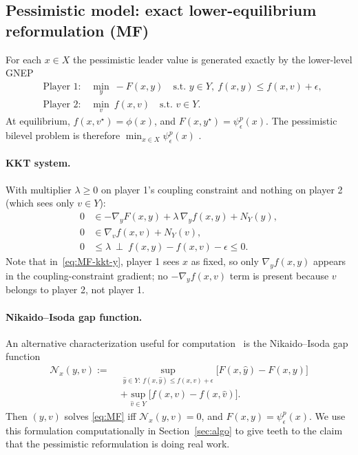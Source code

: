 \documentclass[11pt]{article}
\theoremstyle{definition}
\newcommand{\eps}{\epsilon}
\begin{document}
\subsection{Pessimistic model: exact lower-equilibrium reformulation (MF)}
\label{sec:MF}
For each $x\in X$ the pessimistic leader value is generated
exactly by the lower-level GNEP
\begin{equation}\tag{MF}\label{eq:MF}
\begin{aligned}
  &\text{Player 1:}\quad \min_{y}\ -F(x,y)
  \quad \text{s.t. } y\in Y,\ f(x,y)\le f(x,v)+\eps,\\
  &\text{Player 2:}\quad \min_{v}\ f(x,v)
  \quad \text{s.t. } v\in Y.
\end{aligned}
\end{equation}
At equilibrium, $f(x,v^\star)=\phi(x)$, and
$F(x,y^\star)=\psi_\eps^p(x)$. The pessimistic bilevel problem is
therefore $\min_{x\in X}\psi_\eps^p(x)$
\cite{lampariello2019standard}.

\paragraph{KKT system.}
With multiplier $\lambda\ge 0$ on player 1's coupling constraint
and nothing on player 2 (which sees only $v\in Y$):
\begin{align}
  0&\in -\nabla_y F(x,y)+\lambda\,\nabla_y f(x,y)+N_Y(y),
  \label{eq:MF-kkt-y}\\
  0&\in \nabla_v f(x,v)+N_Y(v),
  \label{eq:MF-kkt-v-fixed}\\
  0&\le\lambda\ \perp\ f(x,y)-f(x,v)-\eps\le 0.
  \label{eq:MF-kkt-comp}
\end{align}
Note that in~\eqref{eq:MF-kkt-y}, player 1 sees $x$ as fixed, so
only $\nabla_y f(x,y)$ appears in the coupling-constraint
gradient; no $-\nabla_y f(x,v)$ term is present because $v$
belongs to player 2, not player 1.

\paragraph{Nikaido--Isoda gap function.}
An alternative characterization useful for
computation~\cite{nikaido1955note,fukushima1992equivalent,harker1991generalized,von2009optimization}
is the Nikaido--Isoda gap function
\begin{equation}\label{eq:NI}
\begin{aligned}
  \mathcal N_x(y,v)
  :=\;& \sup_{\hat y\in Y:\,f(x,\hat y)\le f(x,v)+\eps}
      \bigl[F(x,\hat y)-F(x,y)\bigr]\\
      &+\sup_{\hat v\in Y}\bigl[f(x,v)-f(x,\hat v)\bigr].
\end{aligned}
\end{equation}
Then $(y,v)$ solves \eqref{eq:MF} iff $\mathcal N_x(y,v)=0$, and
$F(x,y)=\psi_\eps^p(x)$. We use this formulation computationally
in Section~\ref{sec:algo} to give teeth to the claim that the
pessimistic reformulation is doing real work.
\end{document}

